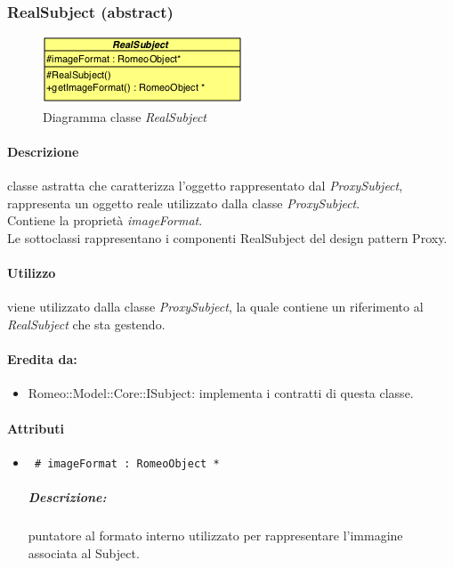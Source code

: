 \pagebreak
\color{black}
\subsubsection{RealSubject (abstract)}
\label{RealSubject}
\begin{figure}[!h]
\centering
			\includegraphics[scale=1]{./Content/Immagini/modelCore/RealSubject.png}
			\caption{Diagramma classe \textsl{RealSubject}}
			\label{realSubject_img}
\end{figure}

\paragraph{Descrizione \\}
classe astratta che caratterizza l’oggetto rappresentato dal \textsl{ProxySubject}, rappresenta un oggetto reale utilizzato dalla classe \textsl{ProxySubject}.
\\Contiene la proprietà \emph{imageFormat}.
\\Le sottoclassi rappresentano i componenti RealSubject del design pattern\g{} Proxy.

\paragraph{Utilizzo \\}
 viene utilizzato dalla classe \textsl{ProxySubject}, la quale contiene un riferimento al \textsl{RealSubject} che sta gestendo.
 
\paragraph{Eredita da:}
\begin{itemize}
	\item Romeo::Model::Core::ISubject: implementa i contratti di questa classe.
\end{itemize}

\paragraph{Attributi}
	\begin{itemize}
		\item \color{teal}\verb! # imageFormat : RomeoObject *!
		\color{black}
		\subparagraph{Descrizione:} puntatore al formato interno utilizzato per rappresentare l'immagine associata al Subject\g{}.
	\end{itemize}

